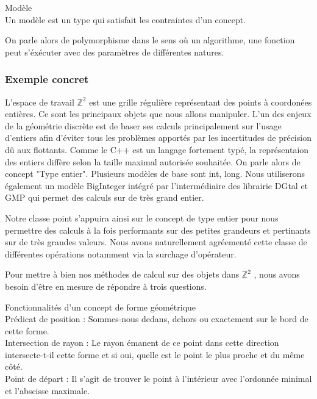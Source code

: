 \begin{Definition}{Modèle}\\
  Un modèle est un type qui satisfait les contraintes d'un concept.
\label{def:cpp-mod}

\end{Definition}

On parle alors de polymorphisme dans le sens où un algorithme, une fonction peut s'éxécuter avec des paramètres de différentes natures.

\subsubsection{Exemple concret}

L'espace de travail $\mathbb{Z}^{2}$ est une grille régulière représentant des points à coordonées entières. Ce sont les principaux objets que nous allons manipuler. L'un des enjeux de la géométrie discrète est de baser ses calculs principalement sur l'usage d'entiers afin d'éviter tous les problèmes apportés par les incertitudes de précision dû aux flottants. Comme le C++ est un langage fortement typé, la représentaion des entiers diffère selon la taille maximal autorisée souhaitée. On parle alors de concept "Type entier". Plusieurs modèles de base sont int, long. Nous utiliserons également un modèle BigInteger intégré par l'intermédiaire des librairie DGtal et GMP qui permet des calculs sur de très grand entier.


Notre classe point s'appuira ainsi sur le concept de type entier pour nous permettre des calculs à la fois performants sur des petites grandeurs et pertinants sur de très grandes valeurs. Nous avons naturellement agréementé cette classe de différentes opérations notamment via la surchage d'opérateur.


Pour mettre à bien nos méthodes de calcul sur des objets dans $\mathbb{Z}^{2}$ , nous avons besoin d'être en mesure de répondre à trois questions.

\begin{Definition}{ Fonctionnalités d'un concept de forme géométrique}\\
\label{def:cpp-fonc}
   Prédicat de position : Sommes-nous dedans, dehors ou exactement sur le bord de cette forme.\\
   Intersection de rayon : Le rayon émanent de ce point dans cette direction intersecte-t-il cette forme et si oui, quelle est le point le plus proche et du même côté.\\
   Point de départ : Il s'agit de trouver le point à l'intérieur avec l'ordonnée minimal et l'abscisse maximale. 
\end{Definition}

